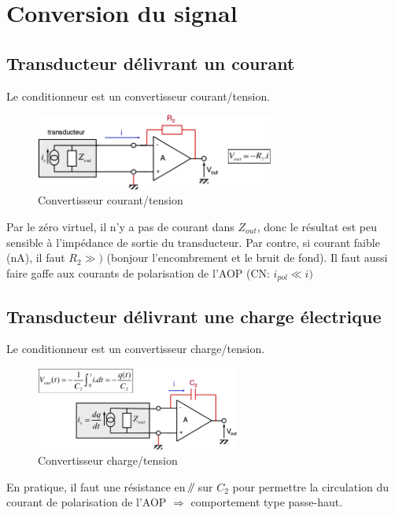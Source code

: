 \section{Conversion du signal}
\subsection{Transducteur délivrant un courant}
Le conditionneur est un convertisseur courant/tension.
\begin{figure}[H] 
	\centering 
	\includegraphics[width=0.7\textwidth,height=10\baselineskip,keepaspectratio]{ch4/image4} 
	\caption{Convertisseur courant/tension} 
\end{figure}
Par le zéro virtuel, il n'y a pas de courant dans \(Z_{out}\), donc le résultat est peu sensible à l'impédance de sortie du transducteur. Par contre, si courant faible (\si{\nano\ampere}), il faut \(R_2\gg)\) (bonjour l'encombrement et le bruit de fond). Il faut aussi faire gaffe aux courants de polarisation de l'AOP (CN: \(i_{pol}\ll i)\)
\subsection{Transducteur délivrant une charge électrique}
Le conditionneur est un convertisseur charge/tension.
\begin{figure}[H] 
	\centering 
	\includegraphics[width=0.6\textwidth,height=10\baselineskip,keepaspectratio]{ch4/image5} 
	\caption{Convertisseur charge/tension} 
\end{figure}
En pratique, il faut une résistance en \(\mathbin{\!/\mkern-5mu/\!}\) sur \(C_2\) pour permettre la circulation du courant de polarisation de l'AOP \(\Rightarrow\) comportement type passe-haut.
